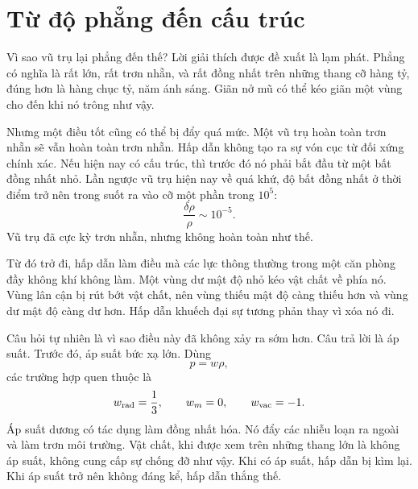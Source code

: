 \begin{classroomqa}
\end{classroomqa}

\begin{classroomqa}
\end{classroomqa}

\section{Từ độ phẳng đến cấu trúc}

Vì sao vũ trụ lại phẳng đến thế? Lời giải thích được đề xuất là lạm phát. Phẳng có nghĩa là rất lớn, rất trơn nhẵn, và rất đồng nhất trên những thang cỡ hàng tỷ, đúng hơn là hàng chục tỷ, năm ánh sáng. Giãn nở mũ có thể kéo giãn một vùng cho đến khi nó trông như vậy.

Nhưng một điều tốt cũng có thể bị đẩy quá mức. Một vũ trụ hoàn toàn trơn nhẵn sẽ vẫn hoàn toàn trơn nhẵn. Hấp dẫn không tạo ra sự vón cục từ đối xứng chính xác. Nếu hiện nay có cấu trúc, thì trước đó nó phải bắt đầu từ một bất đồng nhất nhỏ. Lần ngược vũ trụ hiện nay về quá khứ, độ bất đồng nhất ở thời điểm trở nên trong suốt ra vào cỡ một phần trong \(10^5\):
\begin{equation}
\frac{\delta\rho}{\rho}\sim 10^{-5}.
\end{equation}
Vũ trụ đã cực kỳ trơn nhẵn, nhưng không hoàn toàn như thế.

Từ đó trở đi, hấp dẫn làm điều mà các lực thông thường trong một căn phòng đầy không khí không làm. Một vùng dư mật độ nhỏ kéo vật chất về phía nó. Vùng lân cận bị rút bớt vật chất, nên vùng thiếu mật độ càng thiếu hơn và vùng dư mật độ càng dư hơn. Hấp dẫn khuếch đại sự tương phản thay vì xóa nó đi.

Câu hỏi tự nhiên là vì sao điều này đã không xảy ra sớm hơn. Câu trả lời là áp suất. Trước đó, áp suất bức xạ lớn. Dùng
\begin{equation}
p=w\rho,
\end{equation}
các trường hợp quen thuộc là
\begin{equation}
w_{\rm rad}=\frac13,\qquad
w_m=0,\qquad
w_{\rm vac}=-1.
\end{equation}
Áp suất dương có tác dụng làm đồng nhất hóa. Nó đẩy các nhiễu loạn ra ngoài và làm trơn môi trường. Vật chất, khi được xem trên những thang lớn là không áp suất, không cung cấp sự chống đỡ như vậy. Khi có áp suất, hấp dẫn bị kìm lại. Khi áp suất trở nên không đáng kể, hấp dẫn thắng thế.

